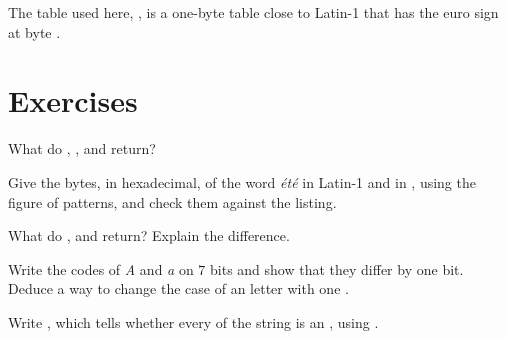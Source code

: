 \label{lst:g10:text-encodings:convert-file}

\label{out:g10:text-encodings:convert-file}

The table used here, , is a one-byte table close to Latin-1 that has the euro sign at byte .

\section{Exercises}\label{sec:g10:text-encodings:exercises}

\begin{exercise}[$\star$]\label{exo:g10:text-encodings:1}
What do , ,  and  return?
\end{exercise}

\begin{exercise}[$\star$]\label{exo:g10:text-encodings:2}
Give the bytes, in hexadecimal, of the word \textit{été} in Latin-1 and in , using the figure of  patterns,
and check them against the listing.
\end{exercise}

\begin{exercise}[$\star$]\label{exo:g10:text-encodings:3}
What do ,  and  return?
Explain the difference.
\end{exercise}

\begin{exercise}[$\star$]\label{exo:g10:text-encodings:4}
Write the codes of \textit{A} and \textit{a} on $7$ bits and show that they differ by one bit. Deduce a way to change
the case of an  letter with one .
\end{exercise}

\begin{exercise}[$\star$]\label{exo:g10:text-encodings:5}
Write , which tells whether every  of the string  is an  , using
.
\end{exercise}


